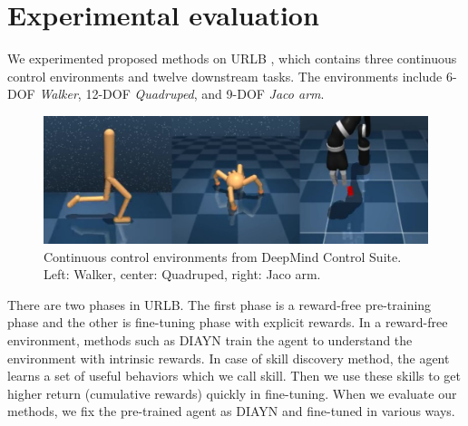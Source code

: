 \section{Experimental evaluation}

We experimented proposed methods on URLB \cite{laskin2021urlb}, which contains three continuous control environments and twelve downstream tasks.
The environments include 6-DOF \emph{Walker}, 12-DOF \emph{Quadruped}, and 9-DOF \emph{Jaco arm}. 

\begin{figure}[ht]
    \vskip 0.2in
    \begin{center}
    \centerline{\includegraphics[width=\columnwidth]{Figures/figure_env.jpg}}
    \caption{Continuous control environments from DeepMind Control Suite. Left: Walker, center: Quadruped, right: Jaco arm.}
    \label{fig:environments}
    \end{center}
    \vskip -0.2in
\end{figure}


There are two phases in URLB.
The first phase is a reward-free pre-training phase and the other is fine-tuning phase with explicit rewards.
In a reward-free environment, methods such as DIAYN train the agent to understand the environment with intrinsic rewards.
In case of skill discovery method, the agent learns a set of useful behaviors which we call skill.
Then we use these skills to get higher return (cumulative rewards) quickly in fine-tuning.
When we evaluate our methods, we fix the pre-trained agent as DIAYN and fine-tuned in various ways.


